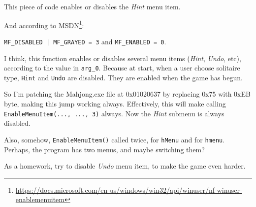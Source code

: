 This piece of code enables or disables the \emph{Hint} menu item.

And according to MSDN\footnote{\url{https://docs.microsoft.com/en-us/windows/win32/api/winuser/nf-winuser-enablemenuitem}}:

\verb$MF_DISABLED | MF_GRAYED = 3$ and \verb|MF_ENABLED = 0|.

I think, this function enables or disables several menu items (\emph{Hint}, \emph{Undo}, etc), according to the value in \verb|arg_0|.
Because at start, when a user choose solitaire type, \verb|Hint| and \verb|Undo| are disabled.
They are enabled when the game has begun.

So I'm patching the Mahjong.exe file at 0x01020637 by replacing 0x75 with 0xEB byte, making this  jump working always.
Effectively, this will make calling \verb|EnableMenuItem(..., ..., 3)| always.
Now the \emph{Hint} submenu is always disabled.

Also, somehow, \verb|EnableMenuItem()| called twice, for \verb|hMenu| and for \verb|hmenu|.
Perhaps, the program has two menus, and maybe switching them?

As a homework, try to disable \emph{Undo} menu item, to make the game even harder.
